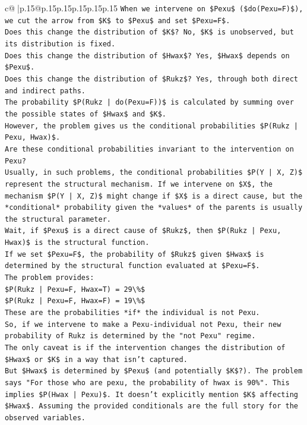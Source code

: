 \documentclass{article}
\begin{document}
{\begin{supertabular}{c@{$\;$}|p{.15\linewidth}@{}p{.15\linewidth}p{.15\linewidth}p{.15\linewidth}p{.15\linewidth}p{.15\linewidth}}
{{{\texttt{When we intervene on \$Pexu\$ (\$do(Pexu=F)\$), we cut the arrow from \$K\$ to \$Pexu\$ and set \$Pexu=F\$.} \\
\texttt{Does this change the distribution of \$K\$? No, \$K\$ is unobserved, but its distribution is fixed.} \\
\texttt{Does this change the distribution of \$Hwax\$? Yes, \$Hwax\$ depends on \$Pexu\$.} \\
\texttt{Does this change the distribution of \$Rukz\$? Yes, through both direct and indirect paths.} \\
\texttt{The probability \$P(Rukz | do(Pexu=F))\$ is calculated by summing over the possible states of \$Hwax\$ and \$K\$.} \\
\texttt{However, the problem gives us the conditional probabilities \$P(Rukz | Pexu, Hwax)\$.} \\
\texttt{Are these conditional probabilities invariant to the intervention on Pexu?} \\
\texttt{Usually, in such problems, the conditional probabilities \$P(Y | X, Z)\$ represent the structural mechanism. If we intervene on \$X\$, the mechanism \$P(Y | X, Z)\$ might change if \$X\$ is a direct cause, but the *conditional* probability given the *values* of the parents is usually the structural parameter.} \\
\texttt{Wait, if \$Pexu\$ is a direct cause of \$Rukz\$, then \$P(Rukz | Pexu, Hwax)\$ is the structural function.} \\
\texttt{If we set \$Pexu=F\$, the probability of \$Rukz\$ given \$Hwax\$ is determined by the structural function evaluated at \$Pexu=F\$.} \\
\texttt{The problem provides:} \\
\texttt{\$P(Rukz | Pexu=F, Hwax=T) = 29\textbackslash{}\%\$} \\
\texttt{\$P(Rukz | Pexu=F, Hwax=F) = 19\textbackslash{}\%\$} \\
\texttt{These are the probabilities *if* the individual is not Pexu.} \\
\texttt{So, if we intervene to make a Pexu{-}individual not Pexu, their new probability of Rukz is determined by the "not Pexu" regime.} \\
\texttt{The only caveat is if the intervention changes the distribution of \$Hwax\$ or \$K\$ in a way that isn't captured.} \\
\texttt{But \$Hwax\$ is determined by \$Pexu\$ (and potentially \$K\$?). The problem says "For those who are pexu, the probability of hwax is 90\%". This implies \$P(Hwax | Pexu)\$. It doesn't explicitly mention \$K\$ affecting \$Hwax\$. Assuming the provided conditionals are the full story for the observed variables.} \\
}}}
\end{supertabular}}
\end{document}
